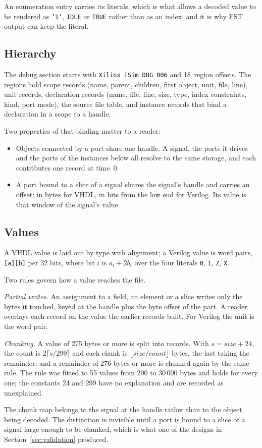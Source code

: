 An enumeration entry carries its literals, which is what allows a
decoded value to be rendered as \texttt{'1'}, \texttt{IDLE} or
\texttt{TRUE} rather than as an index, and it is why FST output can
keep the literal.

\subsection{Hierarchy}

The debug section starts with \texttt{Xilinx ISim DBG 006} and
18~region offsets. The regions hold scope records (name, parent,
children, first object, unit, file, line), unit records, declaration
records (name, file, line, size, type, index constraints, kind, port
mode), the source file table, and instance records that bind a
declaration in a scope to a handle.

Two properties of that binding matter to a reader:

\begin{itemize}
  \item Objects connected by a port share one handle. A signal, the
        ports it drives and the ports of the instances below all
        resolve to the same storage, and each contributes one record
        at time~0.
  \item A port bound to a slice of a signal shares the signal's handle
        and carries an offset: in bytes for VHDL, in bits from the low
        end for Verilog. Its value is that window of the signal's
        value.
\end{itemize}

\subsection{Values}

A VHDL value is laid out by type with alignment; a Verilog value is
word pairs, \texttt{[a][b]} per 32 bits, where bit $i$ is
$a_i + 2b_i$ over the four literals \texttt{0}, \texttt{1}, \texttt{Z},
\texttt{X}.

Two rules govern how a value reaches the file.

\emph{Partial writes.} An assignment to a field, an element or a slice
writes only the bytes it touched, keyed at the handle plus the byte
offset of the part. A reader overlays each record on the value the
earlier records built. For Verilog the unit is the word pair.

\emph{Chunking.} A value of 275 bytes or more is split into records.
With $s = \mathit{size} + 24$, the count is
$2 \lceil s/299 \rceil$ and each chunk is
$\lfloor \mathit{size} / \mathit{count} \rfloor$ bytes, the last
taking the remainder, and a remainder of 276 bytes or more is chunked
again by the same rule. The rule was fitted to 55 values from 200 to
30\,000 bytes and holds for every one; the constants 24 and 299 have
no explanation and are recorded as unexplained.

The chunk map belongs to the signal at the handle rather than to the
object being decoded. The distinction is invisible until a port is
bound to a slice of a signal large enough to be chunked, which is what
one of the designs in Section~\ref{sec:validation} produced.
